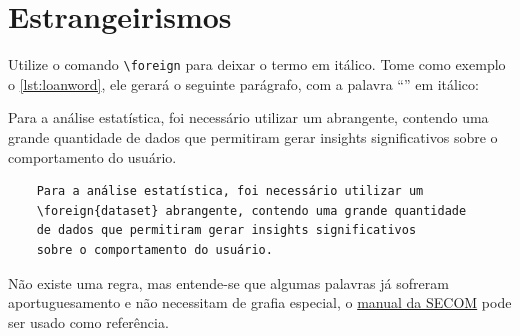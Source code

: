 \begin{table}[htb]
  \begin{center}
  \end{center}
\end{table}

\section{Estrangeirismos}

Utilize o comando \texttt{\textbackslash{}foreign} para deixar o termo em itálico. Tome como exemplo o \autoref{lst:loanword}, ele gerará o seguinte parágrafo, com a palavra \enquote{\dataset} em itálico:

Para a análise estatística, foi necessário utilizar um
 abrangente, contendo uma grande quantidade
de dados que permitiram gerar insights significativos
sobre o comportamento do usuário.

\begin{listing}[htb]
  \begin{verbatim}
    Para a análise estatística, foi necessário utilizar um
    \foreign{dataset} abrangente, contendo uma grande quantidade
    de dados que permitiram gerar insights significativos
    sobre o comportamento do usuário.
  \end{verbatim}
  \caption{Estrangeirismos}
  \label{lst:loanword}
\end{listing}

Não existe uma regra, mas entende-se que algumas palavras já sofreram aportuguesamento e não necessitam de grafia especial, o \href{https://www12.senado.leg.br/manualdecomunicacao/verbetes-acessorio/estrangeirismos-grafados-sem-italico-ou-aspas}{manual da SECOM} pode ser usado como referência.
